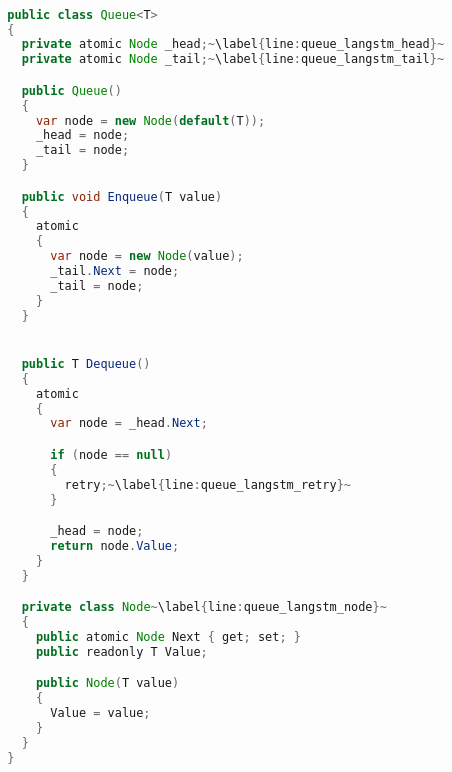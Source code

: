 \begin{lstlisting}[label=lst:impl_queue_lang,
  caption={\stmname Based Concurrent Queue Implementation},
  language=Java,  
  showspaces=false,
  showtabs=false,
  breaklines=true,
  showstringspaces=false,
  breakatwhitespace=true,
  commentstyle=\color{greencomments},
  keywordstyle=\color{bluekeywords},
  stringstyle=\color{redstrings},
  escapechar=~,
  morekeywords={atomic, retry, orelse, var, get, set, ref, out, readonly, virtual, override, region, endregion, foreach, lock}]  % Start your code-block

  public class Queue<T>
  {
    private atomic Node _head;~\label{line:queue_langstm_head}~
    private atomic Node _tail;~\label{line:queue_langstm_tail}~

    public Queue()
    {
      var node = new Node(default(T));
      _head = node;
      _tail = node;
    }

    public void Enqueue(T value)
    {
      atomic
      {
        var node = new Node(value);
        _tail.Next = node;
        _tail = node;
      }
    }


    public T Dequeue()
    {
      atomic
      {
        var node = _head.Next;

        if (node == null)
        {
          retry;~\label{line:queue_langstm_retry}~
        }

        _head = node;
        return node.Value;
      }
    }

    private class Node~\label{line:queue_langstm_node}~
    {
      public atomic Node Next { get; set; }
      public readonly T Value;

      public Node(T value)
      {
        Value = value;
      }
    }
  }

\end{lstlisting}

